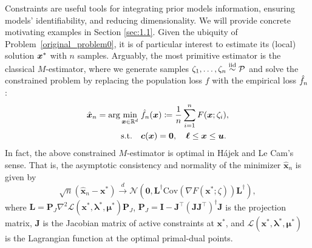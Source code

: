 \documentclass[aos]{imsart}
\numberwithin{equation}{section}
\theoremstyle{plain}
\begin{document}
Constraints are useful tools for integrating prior models information, ensuring models' identifiability, and reducing dimensionality. 
We will provide concrete motivating examples in Section \ref{sec:1.1}. 
Given the ubiquity of Problem~\eqref{original_problem0}, it is of particular interest to estimate its (local) solution $\tx$ with $n$ samples. Arguably, the most primitive estimator is the classical $M$-estimator, where we generate samples $\zeta_1,\ldots,\zeta_n\stackrel{\text{iid}}{\sim} \P$ and solve the constrained problem by replacing the population loss $f$ with the empirical loss $\hf_n$:
\begin{equation*}
	\begin{split}
		\hx_n  = \arg\min_{\bx\in\mR^d}\; & \hf_n(\bx)\coloneqq \frac{1}{n}\sum_{i=1}^{n} F(\bx;\zeta_i),\\
		\text{s.t.} \hspace{1em} & \bm{c}(\bm{x}) = \bm{0},\quad \bm{\ell} \leq \bm{x} \leq \bm{u}.
	\end{split}
\end{equation*}
In fact, the above constrained $M$-estimator is optimal in  H\'ajek and Le Cam's sense.
That is, the asymptotic consistency and normality of the minimizer $\hat{\bm{x}}_{n}$ is given by 
\begin{equation}
\label{M-estimator}
    \sqrt{n} \left( \hat{\bm{x}}_{n} - \bm{x}^{*} \right) \stackrel{d}{\longrightarrow} \mathcal{N} \left( \bm{0}, \bm{L}^{\dag} \text{Cov}\left( \nabla F(\bm{x}^{*};\zeta) \right) \bm{L}^{\dag}\right),
\end{equation}
where $\bm{L} = \bm{P}_{J} \nabla^2 \mathcal{L}(\bm{x}^{*},\bm{\lambda}^{*},\bm{\mu}^{*})\bm{P}_{J}$, $\bm{P}_{J} = \bm{I} - \bm{J}^{\top}\left( \bm{J}\bm{J}^{\top}\right)^{\dag}\bm{J}$ is the projection matrix, $\bm{J}$ is the Jacobian matrix of active constraints at $\bm{x}^{*}$, and $\mathcal{L}(\bm{x}^{*},\bm{\lambda}^{*},\bm{\mu}^{*})$ is the Lagrangian function at the optimal primal-dual points. 
\end{document}
